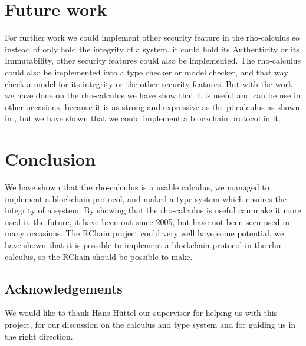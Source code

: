 \section{Future work}
For further work we could implement other security feature in the rho-calculus so instead of only hold the integrity of a system, it could hold its Authenticity or its Immutability, other security features could also be implemented. The rho-calculus could also be implemented into a type checker or model checker, and that way check a model for its integrity or the other security features. But with the work we have done on the rho-calculus we have show that it is useful and can be use in other occasions, because it is as strong and expressive as the pi calculus as shown in \citep{Meredith2005}, but we have shown that we could implement a blockchain protocol in it.



\section{Conclusion}
We have shown that the rho-calculus is a usable calculus, we managed to implement a blockchain protocol, and maked a type system which ensures the integrity of a system. By showing that the rho-calculus is useful can make it more used in the future, it have been out since 2005, but have not been seen used in many occasions. The RChain project could very well have some potential, we have shown that it is possible to implement a blockchain protocol in the rho-calculus, so the RChain should be possible to make.

\subsection*{Acknowledgements}
We would like to thank Hans Hüttel our supervisor for helping us with this project, for our discussion on the calculus and type system and for guiding us in the right direction.
